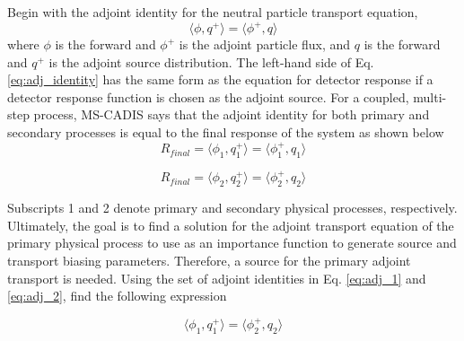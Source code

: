 Begin with the adjoint identity for the neutral particle transport
equation, 
 \begin{equation}\label{eq:adj_identity}
		\langle \phi, q^{+} \rangle =
		\langle \phi^{+}, q \rangle
 \end{equation}
where $\phi$ is the forward and 
$\phi^{+}$ is the adjoint particle flux, and
$q$ is the forward and 
$q^{+}$ is the adjoint source distribution.
The left-hand side of Eq. \ref{eq:adj_identity} has the same form as the
equation for detector response
if a detector response function is chosen as the adjoint source.
For a coupled, multi-step process, MS-CADIS says that the adjoint identity for
both primary and secondary processes is equal to the final response of the
system as shown below
 \begin{equation}\label{eq:adj_1}
	 R_{final} = \langle \phi_{1}, q_{1}^{+} \rangle =
		\langle \phi_{1}^{+} , q_{1} \rangle
 \end{equation}

	 
 \begin{equation}\label{eq:adj_2}
	 R_{final} = \langle \phi_{2}, q_{2}^{+} \rangle =
		\langle \phi_{2}^{+} , q_{2} \rangle
 \end{equation}

Subscripts 1 and 2 denote primary and secondary physical processes,
respectively.  Ultimately, the goal is to find a solution for the adjoint
transport equation of the primary physical process to use as an importance
function to generate source and transport biasing parameters. Therefore, a
source for the primary adjoint transport is needed.  Using the set of adjoint
identities in Eq. \ref{eq:adj_1} and \ref{eq:adj_2}, find the following expression

 \begin{equation}\label{eq:adj_src}
	 \langle \phi_{1}, q_{1}^{+} \rangle =
	 \langle \phi_{2}^{+}, q_{2} \rangle
 \end{equation}

